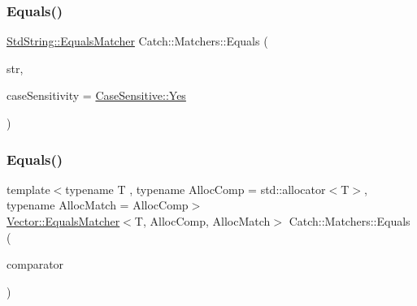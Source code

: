 \subsubsection{\texorpdfstring{Equals()}{Equals()}\hspace{0.1cm}{\footnotesize\ttfamily [1/2]}}
{\footnotesize\ttfamily \mbox{\hyperlink{struct_catch_1_1_matchers_1_1_std_string_1_1_equals_matcher}{Std\+String\+::\+Equals\+Matcher}} Catch\+::\+Matchers\+::\+Equals (\begin{DoxyParamCaption}\item[{std\+::string const \&}]{str,  }\item[{\mbox{\hyperlink{struct_catch_1_1_case_sensitive_aad49d3aee2d97066642fffa919685c6a}{Case\+Sensitive\+::\+Choice}}}]{case\+Sensitivity = {\ttfamily \mbox{\hyperlink{struct_catch_1_1_case_sensitive_aad49d3aee2d97066642fffa919685c6aa7c5550b69ec3c502e6f609b67f9613c6}{Case\+Sensitive\+::\+Yes}}} }\end{DoxyParamCaption})}

\mbox{\label{namespace_catch_1_1_matchers_a3ab7fff821bc655bd4875cc1aa745101}} 
\subsubsection{\texorpdfstring{Equals()}{Equals()}\hspace{0.1cm}{\footnotesize\ttfamily [2/2]}}
{\footnotesize\ttfamily template$<$typename T , typename Alloc\+Comp  = std\+::allocator$<$\+T$>$, typename Alloc\+Match  = Alloc\+Comp$>$ \\
\mbox{\hyperlink{struct_catch_1_1_matchers_1_1_vector_1_1_equals_matcher}{Vector\+::\+Equals\+Matcher}}$<$T, Alloc\+Comp, Alloc\+Match$>$ Catch\+::\+Matchers\+::\+Equals (\begin{DoxyParamCaption}\item[{std\+::vector$<$ T, Alloc\+Comp $>$ const \&}]{comparator }\end{DoxyParamCaption})}

\mbox{\label{namespace_catch_1_1_matchers_a82f1893cf50ae4c14b9b3e0980bf22b8}} 
